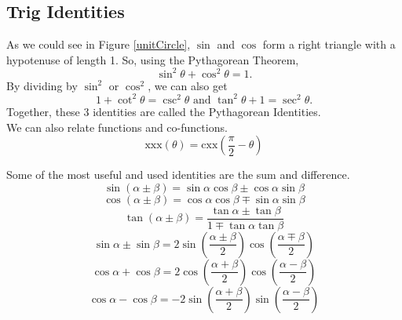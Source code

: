 \subsection{Trig Identities}
\noindent
As we could see in Figure \ref{unitCircle}, $\sin$ and $\cos$ form a right triangle with a hypotenuse of length 1.
So, using the Pythagorean Theorem,
\begin{equation*}
	\sin^2{\theta} + \cos^2{\theta} = 1.
\end{equation*}
By dividing by $\sin^2$ or $\cos^2$, we can also get
\begin{equation*}
	1 + \cot^2{\theta} = \csc^2{\theta} \text{ and } \tan^2{\theta} + 1 = \sec^2{\theta}.
\end{equation*}
Together, these 3 identities are called the Pythagorean Identities.\\

\noindent
We can also relate functions and co-functions.
\begin{equation*}
	\text{xxx}(\theta) = \text{cxx}\left(\frac{\pi}{2} - \theta\right)
\end{equation*}

\noindent
Some of the most useful and used identities are the sum and difference.
\begin{equation*}
	\sin{\left(\alpha \pm \beta\right)} = \sin{\alpha}\cos{\beta} \pm \cos{\alpha}\sin{\beta}
\end{equation*} \begin{equation*}
	\cos{\left(\alpha \pm \beta\right)} = \cos{\alpha}\cos{\beta} \mp \sin{\alpha}\sin{\beta}
\end{equation*} \begin{equation*}
	\tan{\left(\alpha \pm \beta\right)} = \frac{\tan{\alpha} \pm \tan{\beta}}{1 \mp \tan{\alpha}\tan{\beta}}
\end{equation*} \begin{equation*}
	\sin{\alpha} \pm \sin{\beta} = 2\sin{\left(\frac{\alpha \pm \beta}{2}\right)}\cos{\left(\frac{\alpha \mp \beta}{2}\right)}
\end{equation*} \begin{equation*}
	\cos{\alpha} + \cos{\beta} = 2\cos{\left(\frac{\alpha + \beta}{2}\right)}\cos{\left(\frac{\alpha - \beta}{2}\right)}
\end{equation*} \begin{equation*}
	\cos{\alpha} - \cos{\beta} = -2\sin{\left(\frac{\alpha + \beta}{2}\right)}\sin{\left(\frac{\alpha - \beta}{2}\right)}
\end{equation*}